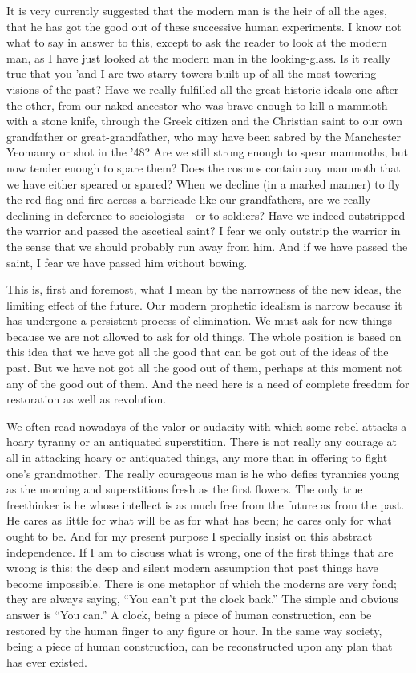 \documentclass{book}
\begin{document}
It is very currently suggested that the modern man is the heir of all the ages, that he has got the good out of these successive human experiments. I know not what to say in answer to this, except to ask the reader to look at the modern man, as I have just looked at the modern man in the looking-glass. Is it really true that you ’and I are two starry towers built up of all the most towering visions of the past? Have we really fulfilled all the great historic ideals one after the other, from our naked ancestor who was brave enough to kill a mammoth with a stone knife, through the Greek citizen and the Christian saint to our own grandfather or great-grandfather, who may have been sabred by the Manchester Yeomanry or shot in the ’48? Are we still strong enough to spear mammoths, but now tender enough to spare them? Does the cosmos contain any mammoth that we have either speared or spared? When we decline (in a marked manner) to fly the red flag and fire across a barricade like our grandfathers, are we really declining in deference to sociologists—or to soldiers? Have we indeed outstripped the warrior and passed the ascetical saint? I fear we only outstrip the warrior in the sense that we should probably run away from him. And if we have passed the saint, I fear we have passed him without bowing.

This is, first and foremost, what I mean by the narrowness of the new ideas, the limiting effect of the future. Our modern prophetic idealism is narrow because it has undergone a persistent process of elimination. We must ask for new things because we are not allowed to ask for old things. The whole position is based on this idea that we have got all the good that can be got out of the ideas of the past. But we have not got all the good out of them, perhaps at this moment not any of the good out of them. And the need here is a need of complete freedom for restoration as well as revolution.

We often read nowadays of the valor or audacity with which some rebel attacks a hoary tyranny or an antiquated superstition. There is not really any courage at all in attacking hoary or antiquated things, any more than in offering to fight one’s grandmother. The really courageous man is he who defies tyrannies young as the morning and superstitions fresh as the first flowers. The only true freethinker is he whose intellect is as much free from the future as from the past. He cares as little for what will be as for what has been; he cares only for what ought to be. And for my present purpose I specially insist on this abstract independence. If I am to discuss what is wrong, one of the first things that are wrong is this: the deep and silent modern assumption that past things have become impossible. There is one metaphor of which the moderns are very fond; they are always saying, “You can’t put the clock back.” The simple and obvious answer is “You can.” A clock, being a piece of human construction, can be restored by the human finger to any figure or hour. In the same way society, being a piece of human construction, can be reconstructed upon any plan that has ever existed.
\end{document}
